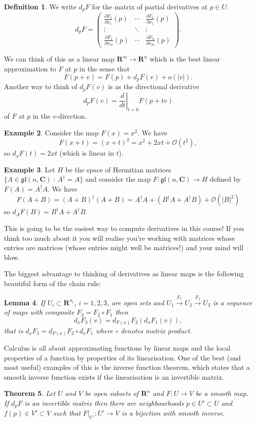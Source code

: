 \documentclass[12pt]{article}
\newcommand{\pd}[2]{\frac{\partial #1}{\partial #2}}
\newcommand{\CC}{\mathbf{C}}
\newcommand{\RR}{\mathbf{R}}
\newcommand{\mats}[4]{\left(\begin{array}{ccc}#1 & \cdots & #2\\ \vdots & \ddots & \vdots \\ #3 & \cdots & #4\end{array}\right)}
\newtheorem{thm}{Theorem}[section]
\newtheorem{lma}[thm]{Lemma}
\theoremstyle{definition}
\newtheorem{dfn}[thm]{Definition}
\newtheorem{exm}[thm]{Example}
\theoremstyle{check}
\theoremstyle{remark}
\theoremstyle{TheoremNum}
\begin{document}
\begin{dfn}
We write $d_pF$ for the matrix of partial derivatives at $p\in U$:
\[d_pF=\mats{\pd{F_1}{x_1}(p)}{\pd{F_n}{x_1}(p)}{\pd{F_1}{x_m}(p)}{\pd{F_n}{x_m}(p)}.\]
\end{dfn}

We can think of this as a linear map $\RR^m\to\RR^n$ which is the best linear approximation to $F$ at $p$ in the sense that
\[F(p+v)=F(p)+d_pF(v)+o(|v|).\]
Another way to think of $d_pF(v)$ is as the directional derivative
\[d_pF(v)=\left.\frac{d}{dt}\right|_{t=0}F(p+tv)\]
of $F$ at $p$ in the $v$-direction.

\begin{exm}
Consider the map $F(x)=x^2$. We have
\[F(x+t)=(x+t)^2=x^2+2xt+\mathcal{O}(t^2),\]
so $d_xF(t)=2xt$ (which is linear in $t$).
\end{exm}
\begin{exm}
Let $H$ be the space of Hermitian matrices $\{A\in\mathfrak{gl}(n,\CC)\ :\ A^{\dagger}=A\}$ and consider the map $F\colon\mathfrak{gl}(n,\CC)\to H$ defined by $F(A)=A^{\dagger}A$. We have
\[F(A+B)=(A+B)^{\dagger}(A+B)=A^{\dagger}A+(B^{\dagger}A+A^{\dagger}B)+\mathcal{O}(|B|^2)\]
so $d_AF(B)=B^{\dagger}A+A^{\dagger}B$.
\end{exm}

This is going to be the easiest way to compute derivatives in this course! If you think too much about it you will realise you're working with matrices whose entries are matrices (whose entries might well be matrices!) and your mind will blow.

The biggest advantage to thinking of derivatives as linear maps is the following beautiful form of the chain rule:
\begin{lma}
If $U_i\subset\RR^{n_i}$, $i=1,2,3$, are open sets and $U_1\stackrel{F_1}{\to}U_2\stackrel{F_2}{\to}U_3$ is a sequence of maps with composite $F_3=F_2\circ F_1$ then
\[d_xF_3(v)=d_{F(x)}F_2(d_xF_1(v)),\]
that is $d_xF_3=d_{F(x)}F_2\circ d_xF_1$ where $\circ$ denotes matrix product.
\end{lma}

Calculus is all about approximating functions by linear maps and the local properties of a function by properties of its linearisation. One of the best (and most useful) examples of this is the inverse function theorem, which states that a smooth inverse function exists if the linearisation is an invertible matrix.

\begin{thm}
Let $U$ and $V$ be open subsets of $\RR^n$ and $F\colon U\to V$ be a smooth map. If $d_pF$ is an invertible matrix then there are neighbourhoods $p\in U'\subset U$ and $f(p)\in V'\subset V$ such that $F|_{U'}\colon U'\to V$ is a bijection with smooth inverse.
\end{thm}
\end{document}
